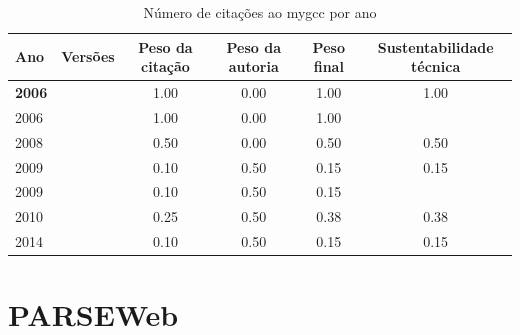 \begin{table}[H]
\caption{Número de citações ao mygcc por ano}
\centering
\begin{tabular}{| l | c | c | c | c | c |}
  \hline
  Ano & Versões & Peso da citação & Peso da autoria & Peso final & Sustentabilidade técnica \\
  \hline
            {\bf 2006}
          &
          
          &
          1.00
          &
          0.00
          &
          1.00
          &
            {\color{blue} 1.00}
          \\
            2006
          &
          
          &
          1.00
          &
          0.00
          &
          1.00
          &
          \\
\hline
            2008
          &
          
          &
          0.50
          &
          0.00
          &
          0.50
          &
            {\color{blue} 0.50}
          \\
\hline
            2009
          &
          
          &
          0.10
          &
          0.50
          &
          0.15
          &
            {\color{red} 0.15}
          \\
            2009
          &
          
          &
          0.10
          &
          0.50
          &
          0.15
          &
          \\
\hline
            2010
          &
          
          &
          0.25
          &
          0.50
          &
          0.38
          &
            {\color{red} 0.38}
          \\
\hline
            2014
          &
          
          &
          0.10
          &
          0.50
          &
          0.15
          &
            {\color{red} 0.15}
          \\
\hline
\end{tabular}
\end{table}



\section{PARSEWeb}


